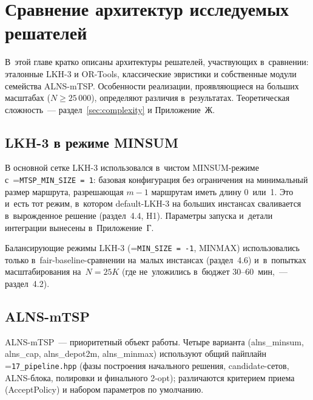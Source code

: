 \documentclass[a4paper,14pt]{extreport}
\makeatletter
\let\old@texttt\texttt
\renewcommand{\texttt}[1]{{\sloppy\hyphenchar\font=\m@ne\old@texttt{#1}}}
\makeatother
\begin{document}
\chapter{Сравнение архитектур исследуемых решателей}

В~этой главе кратко описаны архитектуры решателей, участвующих в~сравнении: эталонные LKH-3 и OR-Tools, классические эвристики и собственные модули семейства ALNS-mTSP. Особенности реализации, проявляющиеся на больших масштабах ($N \geq 25\,000$), определяют различия в~результатах. Теоретическая сложность~--- раздел~\ref{sec:complexity} и Приложение~Ж.

\section{LKH-3 в режиме MINSUM}

В основной сетке LKH-3 использовался в~чистом MINSUM-режиме с~\texttt{MTSP\_MIN\_SIZE\,=\,1}: базовая конфигурация без ограничения на минимальный размер маршрута, разрешающая $m{-}1$ маршрутам иметь длину 0~или~1. Это и~есть тот режим, в~котором default-LKH-3 на больших инстансах сваливается в~вырожденное решение (раздел~4.4, H1). Параметры запуска и~детали интеграции вынесены в~Приложение~Г.

Балансирующие режимы LKH-3 (\texttt{MIN\_SIZE\,=\,-1}, MINMAX) использовались только в~fair-baseline-сравнении на~малых инстансах (раздел~4.6) и~в~попытках масштабирования на~$N=25K$ (где не~уложились в~бюджет 30--60~мин,~--- раздел~4.2).

\section{ALNS-mTSP}

ALNS-mTSP~--- приоритетный объект работы. Четыре варианта (alns\_minsum, alns\_cap, alns\_depot2m, alns\_minmax) используют общий пайплайн \texttt{17\_pipeline.hpp} (фазы построения начального решения, candidate-сетов, ALNS-блока, полировки и финального 2-opt); различаются критерием приема (AcceptPolicy) и набором параметров по умолчанию.
\end{document}
